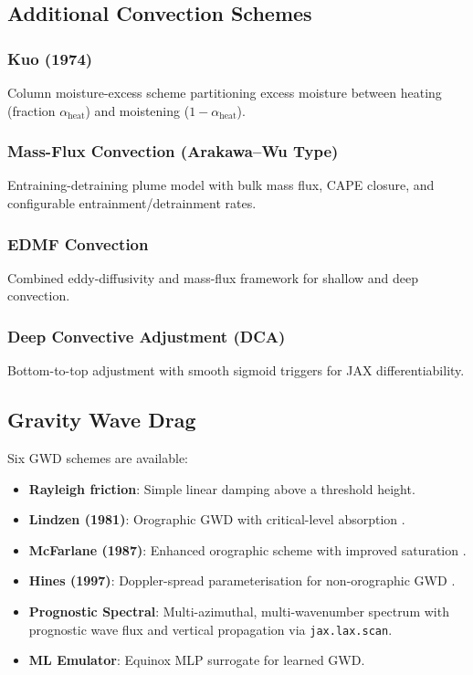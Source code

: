 \documentclass[11pt,a4paper]{article}
\begin{document}
\subsection{Additional Convection Schemes}

\subsubsection{Kuo (1974)}
Column moisture-excess scheme \citep{Kuo1974} partitioning excess moisture between heating (fraction $\alpha_{\mathrm{heat}}$) and moistening ($1-\alpha_{\mathrm{heat}}$).

\subsubsection{Mass-Flux Convection (Arakawa--Wu Type)}
Entraining-detraining plume model with bulk mass flux, CAPE closure, and configurable entrainment/detrainment rates.

\subsubsection{EDMF Convection}
Combined eddy-diffusivity and mass-flux framework for shallow and deep convection.

\subsubsection{Deep Convective Adjustment (DCA)}
Bottom-to-top adjustment with smooth sigmoid triggers for JAX differentiability.

\subsection{Gravity Wave Drag}

Six GWD schemes are available:
\begin{itemize}[nosep]
  \item \textbf{Rayleigh friction}: Simple linear damping above a threshold height.
  \item \textbf{Lindzen (1981)}: Orographic GWD with critical-level absorption \citep{Lindzen1981}.
  \item \textbf{McFarlane (1987)}: Enhanced orographic scheme with improved saturation \citep{McFarlane1987}.
  \item \textbf{Hines (1997)}: Doppler-spread parameterisation for non-orographic GWD \citep{Hines1997}.
  \item \textbf{Prognostic Spectral}: Multi-azimuthal, multi-wavenumber spectrum with prognostic wave flux and vertical propagation via \texttt{jax.lax.scan}.
  \item \textbf{ML Emulator}: Equinox MLP surrogate for learned GWD.
\end{itemize}
\end{document}
